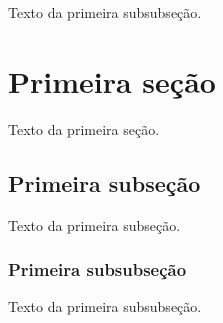 \documentclass[a4paper,12pt,oneside,onecolumn,final,fleqn]{repUERJ}
\begin{document}
Texto da primeira subsubseção.


\section{Primeira seção}

Texto da primeira seção.

\subsection{Primeira subseção}

Texto da primeira subseção.

\subsubsection{Primeira subsubseção}

Texto da primeira subsubseção.

\end{document}
